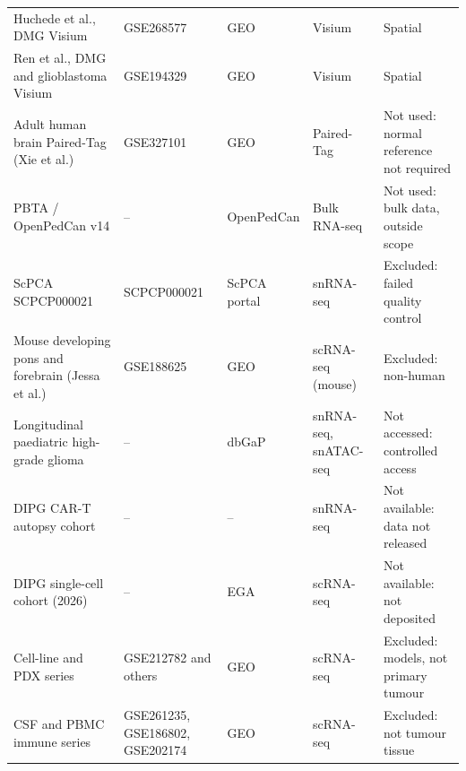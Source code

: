 \begin{landscape}
\begin{longtable}{>{\raggedright\arraybackslash}p{6.2cm}>{\raggedright\arraybackslash}p{6.0cm}>{\raggedright\arraybackslash}p{3.2cm}>{\raggedright\arraybackslash}p{3.4cm}>{\raggedright\arraybackslash}p{4.6cm}}
Huchede et al., DMG Visium & GSE268577 & GEO & Visium & Spatial \\
Ren et al., DMG and glioblastoma Visium & GSE194329 & GEO & Visium & Spatial \\
\midrule
Adult human brain Paired-Tag (Xie et al.) & GSE327101 & GEO & Paired-Tag & Not used: normal reference not required \\
PBTA / OpenPedCan v14 & -- & OpenPedCan & Bulk RNA-seq & Not used: bulk data, outside scope \\
ScPCA SCPCP000021 & SCPCP000021 & ScPCA portal & snRNA-seq & Excluded: failed quality control \\
Mouse developing pons and forebrain (Jessa et al.) & GSE188625 & GEO & scRNA-seq (mouse) & Excluded: non-human \\
Longitudinal paediatric high-grade glioma & -- & dbGaP & snRNA-seq, snATAC-seq & Not accessed: controlled access \\
DIPG CAR-T autopsy cohort & -- & -- & snRNA-seq & Not available: data not released \\
DIPG single-cell cohort (2026) & -- & EGA & scRNA-seq & Not available: not deposited \\
Cell-line and PDX series & GSE212782 and others & GEO & scRNA-seq & Excluded: models, not primary tumour \\
CSF and PBMC immune series & GSE261235, GSE186802, GSE202174 & GEO & scRNA-seq & Excluded: not tumour tissue \\
\bottomrule
\end{longtable}
\end{landscape}
